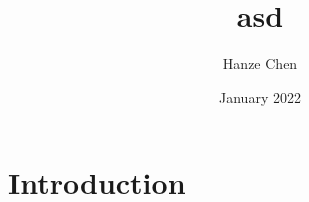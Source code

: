 \documentclass{article}
\title{asd}
\author{Hanze Chen}
\date{January 2022}
\begin{document}
\maketitle

\section{Introduction}

\printindex
\end{document}
